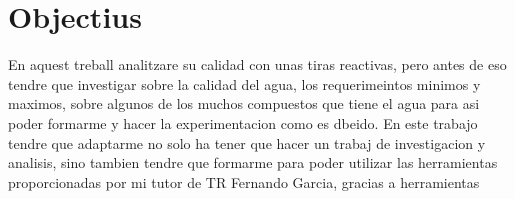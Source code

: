 \chapter{Objectius}

En aquest treball analitzare su calidad con unas tiras reactivas, pero antes de eso tendre que investigar sobre la calidad del agua, los requerimeintos minimos y maximos, sobre algunos de los muchos compuestos que tiene el agua para asi poder formarme y hacer la experimentacion como es dbeido.
En este trabajo tendre que adaptarme no solo ha tener que hacer un trabaj de investigacion y analisis, sino tambien tendre que formarme para poder utilizar las herramientas proporcionadas por mi tutor de TR Fernando Garcia, gracias a herramientas
